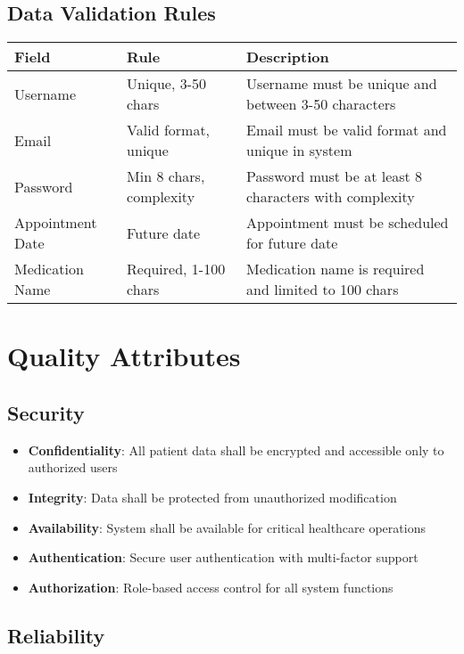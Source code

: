 \documentclass[12pt,a4paper]{article}
\begin{document}
\subsection{Data Validation Rules}

\begin{longtable}{|p{3cm}|p{3cm}|p{8cm}|}
\hline
\textbf{Field} & \textbf{Rule} & \textbf{Description} \\
\hline
Username & Unique, 3-50 chars & Username must be unique and between 3-50 characters \\
\hline
Email & Valid format, unique & Email must be valid format and unique in system \\
\hline
Password & Min 8 chars, complexity & Password must be at least 8 characters with complexity \\
\hline
Appointment Date & Future date & Appointment must be scheduled for future date \\
\hline
Medication Name & Required, 1-100 chars & Medication name is required and limited to 100 chars \\
\hline
\end{longtable}

\section{Quality Attributes}

\subsection{Security}

\begin{itemize}
    \item \textbf{Confidentiality}: All patient data shall be encrypted and accessible only to authorized users
    \item \textbf{Integrity}: Data shall be protected from unauthorized modification
    \item \textbf{Availability}: System shall be available for critical healthcare operations
    \item \textbf{Authentication}: Secure user authentication with multi-factor support
    \item \textbf{Authorization}: Role-based access control for all system functions
\end{itemize}

\subsection{Reliability}
\end{document}
